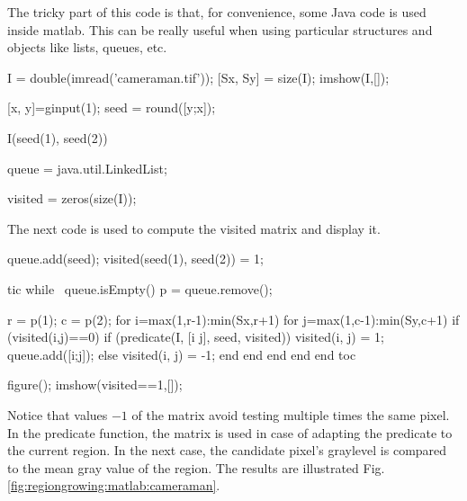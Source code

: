 \def\QRCODE{TB_image_TUT.IMG.segmentation_region_growing_matlabqrcode.png}
\def\QRPAGE{http://www.iptutorials.science/tree/master/TB_image/TUT.IMG.segmentation_region_growing/matlab}

The tricky part of this code is that, for convenience, some Java code is used inside matlab. This can be really useful when using particular structures and objects like lists, queues, etc.

\begin{matlab}
I = double(imread('cameraman.tif'));
[Sx, Sy] = size(I);
imshow(I,[]);

[x, y]=ginput(1);
seed = round([y;x]); %

I(seed(1), seed(2))

queue = java.util.LinkedList;

visited = zeros(size(I));
\end{matlab}

The next code is used to compute the visited matrix and display it.
\begin{matlab}
queue.add(seed); 
visited(seed(1), seed(2)) = 1;

tic
while ~queue.isEmpty()
   p = queue.remove();
   
   r = p(1); %
   c = p(2); %
   for i=max(1,r-1):min(Sx,r+1)
       for j=max(1,c-1):min(Sy,c+1)
           if (visited(i,j)==0) %
               if (predicate(I, [i j], seed, visited)) 
                    visited(i, j) = 1;
                    queue.add([i;j]); %
               else
                   visited(i, j) = -1;
               end
           end
       end
   end
end
toc

figure(); imshow(visited==1,[]);
\end{matlab}


Notice that values $-1$ of the  matrix avoid testing multiple times the same pixel. In the predicate function, the  matrix is used in case of adapting the predicate to the current region. In the next case, the candidate pixel's graylevel is compared to the mean gray value of the region. The results are illustrated Fig.\ref{fig:regiongrowing:matlab:cameraman}.

